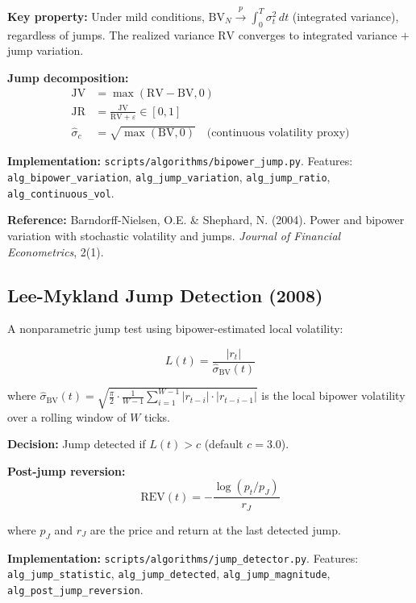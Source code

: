\documentclass[11pt,a4paper]{article}
\begin{document}
\textbf{Key property:} Under mild conditions, $\text{BV}_N \xrightarrow{p} \int_0^T \sigma_t^2 \, dt$ (integrated variance), regardless of jumps. The realized variance $\text{RV}$ converges to integrated variance $+$ jump variation.

\textbf{Jump decomposition:}
\begin{align}
\text{JV} &= \max(\text{RV} - \text{BV}, 0) \\
\text{JR} &= \frac{\text{JV}}{\text{RV} + \varepsilon} \in [0, 1] \\
\hat{\sigma}_c &= \sqrt{\max(\text{BV}, 0)} \quad \text{(continuous volatility proxy)}
\end{align}

\textbf{Implementation:} \texttt{scripts/algorithms/bipower\_jump.py}. Features: \texttt{alg\_bipower\_variation}, \texttt{alg\_jump\_variation}, \texttt{alg\_jump\_ratio}, \texttt{alg\_continuous\_vol}.

\textbf{Reference:} Barndorff-Nielsen, O.E. \& Shephard, N. (2004). Power and bipower variation with stochastic volatility and jumps. \textit{Journal of Financial Econometrics}, 2(1).

\subsection{Lee-Mykland Jump Detection (2008)}

A nonparametric jump test using bipower-estimated local volatility:

\begin{equation}
L(t) = \frac{|r_t|}{\hat{\sigma}_{\text{BV}}(t)}
\end{equation}

where $\hat{\sigma}_{\text{BV}}(t) = \sqrt{\frac{\pi}{2} \cdot \frac{1}{W-1} \sum_{i=1}^{W-1} |r_{t-i}| \cdot |r_{t-i-1}|}$ is the local bipower volatility over a rolling window of $W$ ticks.

\textbf{Decision:} Jump detected if $L(t) > c$ (default $c = 3.0$).

\textbf{Post-jump reversion:}
\begin{equation}
\text{REV}(t) = -\frac{\log(p_t / p_J)}{r_J}
\end{equation}

where $p_J$ and $r_J$ are the price and return at the last detected jump.

\textbf{Implementation:} \texttt{scripts/algorithms/jump\_detector.py}. Features: \texttt{alg\_jump\_statistic}, \texttt{alg\_jump\_detected}, \texttt{alg\_jump\_magnitude}, \texttt{alg\_post\_jump\_reversion}.
\end{document}
